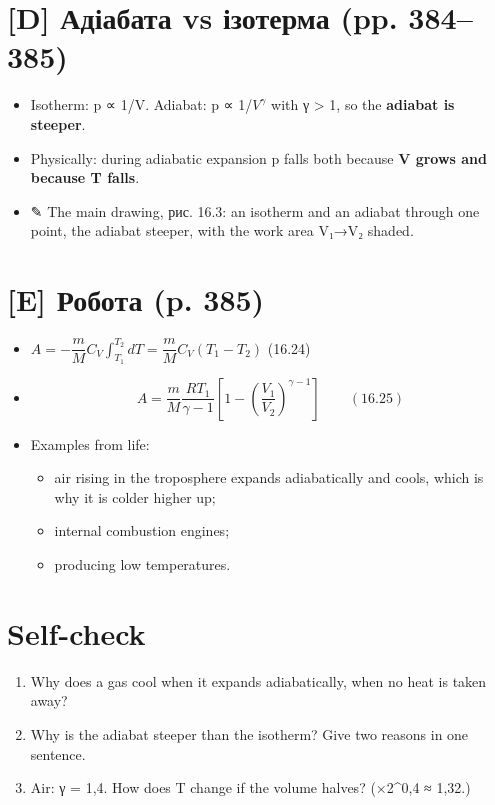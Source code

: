 \documentclass[11pt,a4paper,oneside]{book}
\newcommand{\pen}{{\sffamily\color{accent}✎}}
\begin{document}
\section*{[D] Адіабата vs ізотерма (pp. 384–385)}
\begin{itemize}
\item Isotherm: p ∝ 1/V. Adiabat: p ∝ 1/$V^{γ}$ with γ > 1, so the \textbf{adiabat is steeper}.
\item Physically: during adiabatic expansion p falls both because \textbf{V grows and because T falls}.
\item \pen{} The main drawing, рис. 16.3: an isotherm and an adiabat through one point, the adiabat steeper, with the work area V₁→V₂ shaded.
\end{itemize}

\section*{[E] Робота (p. 385)}
\begin{itemize}
\item $A = -\dfrac mMC_V\int_{T_1}^{T_2}dT = \dfrac mMC_V(T_1 - T_2)$ (16.24)
\item \[A = \frac mM\frac{RT_1}{\gamma - 1}\left[1 - \left(\frac{V_1}{V_2}\right)^{\gamma-1}\right]\qquad(16.25)\]
\item Examples from life:
\begin{itemize}
\item air rising in the troposphere expands adiabatically and cools, which is why it is colder higher up;
\item internal combustion engines;
\item producing low temperatures.
\end{itemize}
\end{itemize}

\section*{Self-check}
\begin{enumerate}
\item Why does a gas cool when it expands adiabatically, when no heat is taken away?
\item Why is the adiabat steeper than the isotherm? Give two reasons in one sentence.
\item Air: γ = 1,4. How does T change if the volume halves? (×2\textasciicircum{}0,4 ≈ 1,32.)
\end{enumerate}
\end{document}
